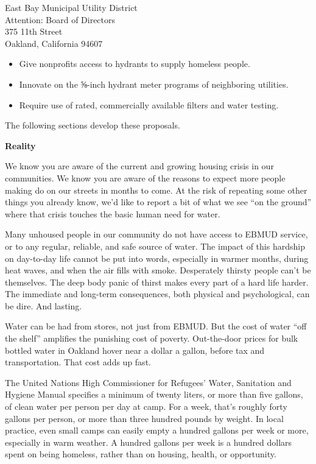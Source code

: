 \documentclass[letterpaper]{letter}
\begin{document}
\begin{letter}{%
    East Bay Municipal Utility District\\
    Attention: Board of Directors\\
    375 11th Street\\
    Oakland, California 94607}
\begin{samepage}
    \begin{itemize}
      \item Give nonprofits access to hydrants to supply homeless people.
      \item Innovate on the ⅝-inch hydrant meter programs of neighboring utilities.
      \item Require use of rated, commercially available filters and water testing.
    \end{itemize}

    The following sections develop these proposals.
    \end{samepage}

    \stopbreaks
    \textbf{Reality}

    We know you are aware of the current and growing housing crisis in our communities. We know you are aware of the reasons to expect more people making do on our streets in months to come. At the risk of repeating some other things you already know, we’d like to report a bit of what we see “on the ground” where that crisis touches the basic human need for water.
    \startbreaks

    Many unhoused people in our community do not have access to EBMUD service, or to any regular, reliable, and safe source of water. The impact of this hardship on day-to-day life cannot be put into words, especially in warmer months, during heat waves, and when the air fills with smoke. Desperately thirsty people can’t be themselves. The deep body panic of thirst makes every part of a hard life harder. The immediate and long-term consequences, both physical and psychological, can be dire. And lasting.

    Water can be had from stores, not just from EBMUD. But the cost of water “off the shelf” amplifies the punishing cost of poverty. Out-the-door prices for bulk bottled water in Oakland hover near a dollar a gallon, before tax and transportation. That cost adds up fast.

    The United Nations High Commissioner for Refugees’ Water, Sanitation and Hygiene Manual specifies a minimum of twenty liters, or more than five gallons, of clean water per person per day at camp. For a week, that’s roughly forty gallons per person, or more than three hundred pounds by weight. In local practice, even small camps can easily empty a hundred gallons per week or more, especially in warm weather. A hundred gallons per week is a hundred dollars spent on being homeless, rather than on housing, health, or opportunity.


\end{letter}
\end{document}
